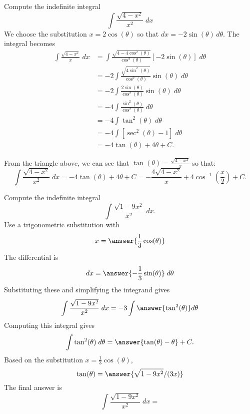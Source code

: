 \documentclass{ximera}
\begin{document}
\begin{example}
Compute the indefinite integral
\[
\int \frac{\sqrt{4-x^2}}{x^2} \; dx
\]
We choose the substitution $x = 2\cos(\theta)$ so that $dx = -2\sin(\theta) \, d\theta$.
The integral becomes
\begin{align*}
\int \frac{\sqrt{4-x^2}}{x} \; dx &= \int \frac{\sqrt{4-4\cos^2(\theta)}}{\cos^2(\theta)} [-2\sin(\theta)] \; d\theta\\
                                  &= -2\int \frac{\sqrt{4\sin^2(\theta)}}{\cos^2(\theta)}  \sin(\theta) \; d\theta\\
                                  &= -2\int \frac{2\sin(\theta)}{\cos^2(\theta)}  \sin(\theta) \; d\theta\\
 &= -4\int \frac{\sin^2(\theta)}{\cos^2(\theta)}  \; d\theta\\
 &= -4\int \tan^2(\theta)  \; d\theta\\
&= -4\int [\sec^2(\theta) - 1] \; d\theta\\
&= -4\tan(\theta) + 4\theta + C.
\end{align*}

From the triangle above, we can see that $\tan(\theta) = \frac{\sqrt{4-x^2}}{x}$ so that:
\[
\int \frac{\sqrt{4-x^2}}{x^2} \; dx = -4\tan(\theta) + 4\theta + C = -\frac{4\sqrt{4-x^2}}{x} + 4\cos^{-1}\left(\frac{x}{2}\right) + C. 
\]

\end{example}



\begin{problem}

Compute the indefinite integral
\[
\int \frac{\sqrt{1-9x^2}}{x^2} \; dx.
\]
Use a trigonometric substitution with\\
\[
x = \answer{\frac13\cos(\theta)}
\]
The differential is\\
\[
dx = \answer{-\frac13\sin(\theta)} \; d\theta
\]
Substituting these and simplifying the integrand gives\\
\[
\int \frac{\sqrt{1-9x^2}}{x^2} \; dx = -3\int \answer{\tan^2(\theta)} d\theta
\]
Computing this integral gives
\[
\int \tan^2(\theta) \; d\theta = \answer{\tan(\theta) - \theta} + C.
\]
Based on the substitution $x = \frac13 \cos(\theta)$, \\
\[
\tan(\theta) = \answer{\sqrt{1-9x^2}/(3x)}
\]
The final answer is
\[
\int  \frac{\sqrt{1-9x^2}}{x^2} \; dx = 
\]
\begin{center}
\begin{multipleChoice}
\end{multipleChoice}
\end{center}





\end{problem}
\end{document}
